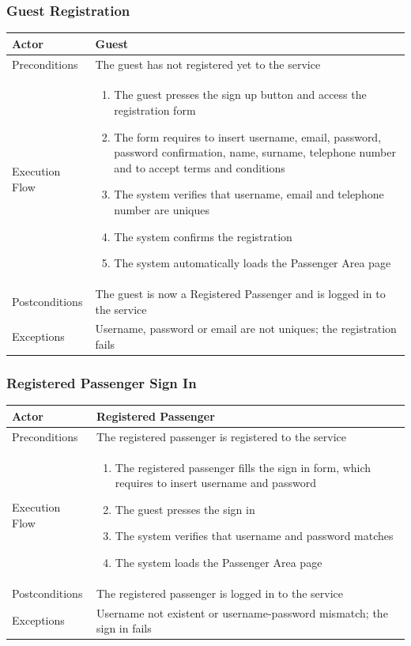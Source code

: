 		\subsubsection{Guest Registration}
			\begin{center}
				\begin{tabular}{ | l | p{8cm} |}
					\hline
					Actor &  Guest	\\ \hline
					Preconditions & The guest has not registered yet to the service		\\ \hline
					Execution Flow & \begin{enumerate}
						\item The guest presses the sign up button and access the registration form
						\item The form requires to insert username, email, password, password confirmation, name, surname, telephone number and to accept terms and conditions
						\item The system verifies that username, email and telephone number are uniques
						\item The system confirms the registration
						\item The system automatically loads the Passenger Area page
					\end{enumerate}		\\ \hline
					Postconditions & The guest is now a Registered Passenger and is logged in to the service	\\ \hline
					Exceptions & Username, password or email are not uniques; the registration fails \\ \hline
				\end{tabular}
			\end{center}
		\subsubsection{Registered Passenger Sign In}
			\begin{center}
				\begin{tabular}{ | l | p{8cm} |}
					\hline
					Actor &  Registered Passenger	\\ \hline
					Preconditions & The registered passenger is registered to the service	\\ \hline
					Execution Flow & \begin{enumerate}
						\item The registered passenger fills the sign in form, which requires to insert username and password
						\item The guest presses the sign in
						\item The system verifies that username and password matches
						\item The system loads the Passenger Area page
					\end{enumerate}		\\ \hline
					Postconditions & The registered passenger is logged in to the service	\\ \hline
					Exceptions & Username not existent or username-password mismatch; the sign in fails \\ \hline
				\end{tabular}
			\end{center}
